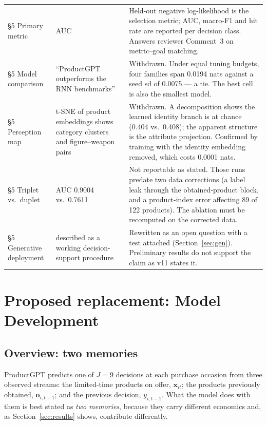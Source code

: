 \documentclass[11pt]{article}
\newcommand{\new}[1]{\textcolor{blue!60!black}{#1}}
\newcommand{\drop}[1]{\textcolor{red!60!black}{#1}}
\begin{document}
\begin{longtable}{p{3.4cm}p{5.2cm}p{5.6cm}}
\S5 Primary metric & AUC & \new{Held-out negative log-likelihood is the
selection metric; AUC, macro-F1 and hit rate are reported per decision class.
Answers reviewer Comment~3 on metric--goal matching.} \\
\addlinespace
\S5 Model comparison & ``ProductGPT outperforms the RNN benchmarks'' &
\drop{Withdrawn.} \new{Under equal tuning budgets, four families span 0.0194
nats against a seed sd of 0.0075 --- a tie. The best cell is also the smallest
model.} \\
\addlinespace
\S5 Perception map & t-SNE of product embeddings shows category clusters and
figure--weapon pairs & \drop{Withdrawn.} \new{A decomposition shows the learned
identity branch is at chance (0.404 vs.\ 0.408); the apparent structure is the
attribute projection. Confirmed by training with the identity embedding
removed, which costs 0.0001 nats.} \\
\addlinespace
\S5 Triplet vs.\ duplet & AUC 0.9004 vs.\ 0.7611 & \drop{Not reportable as
stated.} \new{Those runs predate two data corrections (a label leak through the
obtained-product block, and a product-index error affecting 89 of 122
products). The ablation must be recomputed on the corrected data.} \\
\addlinespace
\S5 Generative deployment & described as a working decision-support procedure &
\new{Rewritten as an open question with a test attached
(Section~\ref{sec:gen}). Preliminary results do not support the claim as v11
states it.} \\
\bottomrule
\end{longtable}

\section{Proposed replacement: Model Development}

\subsection*{Overview: two memories}

ProductGPT predicts one of $J=9$ decisions at each purchase occasion from three
observed streams: the limited-time products on offer, $\mathbf{x}_{it}$; the
products previously obtained, $\mathbf{o}_{i,t-1}$; and the previous decision,
$y_{i,t-1}$. What the model does with them is best stated as \emph{two
memories}, because they carry different economics and, as
Section~\ref{sec:results} shows, contribute differently.
\end{document}
